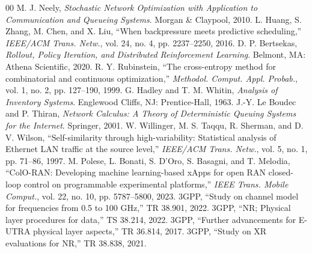 \documentclass[journal]{IEEEtran}
\begin{document}
\begin{thebibliography}{00}
 M. J. Neely, \emph{Stochastic Network Optimization with Application to Communication and Queueing Systems}. Morgan \& Claypool, 2010.
 L. Huang, S. Zhang, M. Chen, and X. Liu, ``When backpressure meets predictive scheduling,'' \emph{IEEE/ACM Trans. Netw.}, vol. 24, no. 4, pp. 2237--2250, 2016.
 D. P. Bertsekas, \emph{Rollout, Policy Iteration, and Distributed Reinforcement Learning}. Belmont, MA: Athena Scientific, 2020.
 R. Y. Rubinstein, ``The cross-entropy method for combinatorial and continuous optimization,'' \emph{Methodol. Comput. Appl. Probab.}, vol. 1, no. 2, pp. 127--190, 1999.
 G. Hadley and T. M. Whitin, \emph{Analysis of Inventory Systems}. Englewood Cliffs, NJ: Prentice-Hall, 1963.
 J.-Y. Le Boudec and P. Thiran, \emph{Network Calculus: A Theory of Deterministic Queuing Systems for the Internet}. Springer, 2001.
 W. Willinger, M. S. Taqqu, R. Sherman, and D. V. Wilson, ``Self-similarity through high-variability: Statistical analysis of Ethernet LAN traffic at the source level,'' \emph{IEEE/ACM Trans. Netw.}, vol. 5, no. 1, pp. 71--86, 1997.
 M. Polese, L. Bonati, S. D'Oro, S. Basagni, and T. Melodia, ``ColO-RAN: Developing machine learning-based xApps for open RAN closed-loop control on programmable experimental platforms,'' \emph{IEEE Trans. Mobile Comput.}, vol. 22, no. 10, pp. 5787--5800, 2023.
 3GPP, ``Study on channel model for frequencies from 0.5 to 100 GHz,'' TR 38.901, 2022.
 3GPP, ``NR; Physical layer procedures for data,'' TS 38.214, 2022.
 3GPP, ``Further advancements for E-UTRA physical layer aspects,'' TR 36.814, 2017.
 3GPP, ``Study on XR evaluations for NR,'' TR 38.838, 2021.
\end{thebibliography}
\end{document}
